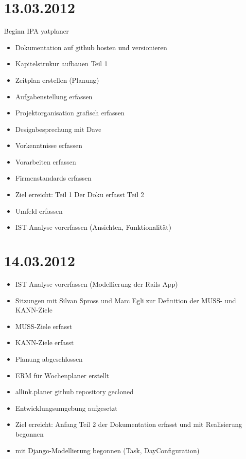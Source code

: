 \section{13.03.2012}
Beginn IPA yatplaner
\begin{itemize}
    \item Dokumentation auf github hosten und versionieren
    \item Kapitelstrukur aufbauen 
    Teil 1\\
    \item Zeitplan erstellen (Planung)
    \item Aufgabenstellung erfassen
    \item Projektorganisation grafisch erfassen
    \item Designbesprechung mit Dave
    \item Vorkenntnisse erfassen
    \item Vorarbeiten erfassen
    \item Firmenstandards erfassen
    \item Ziel erreicht: Teil 1 Der Doku erfasst
    Teil 2\\
    \item Umfeld erfassen
    \item IST-Analyse vorerfassen (Ansichten, Funktionalität)
\end{itemize}
\section{14.03.2012}
\begin{itemize}
    \item IST-Analyse vorerfassen (Modellierung der Rails App)
    \item Sitzungen mit Silvan Spross und Marc Egli zur Definition der MUSS- und KANN-Ziele
    \item MUSS-Ziele erfasst
    \item KANN-Ziele erfasst
    \item Planung abgeschlossen
    \item ERM für Wochenplaner erstellt
    \item allink.planer github repository gecloned
    \item Entwicklungsumgebung aufgesetzt
    \item Ziel erreicht: Anfang Teil 2 der Dokumentation erfasst und mit Realisierung begonnen
    \item mit Django-Modellierung begonnen (Task, DayConfiguration)
\end{itemize}
